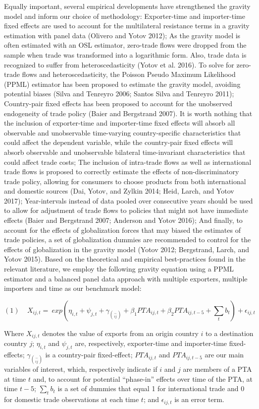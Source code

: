 \documentclass{article}%
\begin{document}
Equally important, several empirical developments have strengthened the
gravity model and inform our choice of methodology: Exporter-time and
importer-time fixed effects are used to account for the multilateral
resistance terms in a gravity estimation with panel data (Olivero and
Yotov 2012); As the gravity model is often estimated with an OSL
estimator, zero-trade flows were dropped from the sample when trade was
transformed into a logarithmic form. Also, trade data is recognized to
suffer from heteroscedasticity (Yotov et al. 2016). To solve for
zero-trade flows and heteroscedasticity, the Poisson Pseudo Maximum
Likelihood (PPML) estimator has been proposed to estimate the gravity
model, avoiding potential biases (Silva and Tenreyro 2006; Santos Silva
and Tenreyro 2011); Country-pair fixed effects has been proposed to
account for the unobserved endogeneity of trade policy (Baier and
Bergstrand 2007). It is worth nothing that the inclusion of
exporter-time and importer-time fixed effects will absorb all observable
and unobservable time-varying country-specific characteristics that
could affect the dependent variable, while the country-pair fixed
effects will absorb observable and unobservable bilateral time-invariant
characteristics that could affect trade costs; The inclusion of
intra-trade flows as well as international trade flows is proposed to
correctly estimate the effects of non-discriminatory trade policy,
allowing for consumers to choose products from both international and
domestic sources (Dai, Yotov, and Zylkin 2014; Heid, Larch, and Yotov
2017); Year-intervals instead of data pooled over consecutive years
should be used to allow for adjustment of trade flows to policies that
might not have immediate effects (Baier and Bergstrand 2007; Anderson
and Yotov 2016); And finally, to account for the effects of
globalization forces that may biased the estimates of trade policies, a
set of globalization dummies are recommended to control for the effects
of globalization in the gravity model (Yotov 2012; Bergstrand, Larch,
and Yotov 2015). Based on the theoretical and empirical best-practices
found in the relevant literature, we employ the following gravity
equation using a PPML estimator and a balanced panel data approach with
multiple exporters, multiple importers and time as our benchmark model:

\[(1)\ \ \ \ \ X_{ij,t} = \ exp(\eta_{i,t} + \psi_{j,t} + \gamma_{\binom{-}{ij}} + \beta_{1}{PTA}_{ij,t} + \beta_{2}{PTA}_{ij,t - 5} + \sum_{t}^{}b_{t}) + \epsilon_{ij,t}\]

Where \(X_{ij,t}\) denotes the value of exports from an origin country
\(i\) to a destination country \(j\); \(\eta_{i,t}\) and \(\psi_{j,t}\)
are, respectively, exporter-time and importer-time fixed-effects;
\(\gamma_{\binom{-}{ij}}\) is a country-pair fixed-effect;
\({PTA}_{ij,t}\) and \({PTA}_{ij,t - 5}\) are our main variables of
interest, which, respectively indicate if \(i\) and \(j\) are members of
a PTA at time \(t\) and, to account for potential ``phase-in'' effects
over time of the PTA, at time \(t - 5\); \(\sum_{t}^{}b_{t}\) is a set
of dummies that equal 1 for international trade and 0 for domestic trade
observations at each time \(t\); and \(\epsilon_{ij,t}\) is an error
term.
\end{document}

